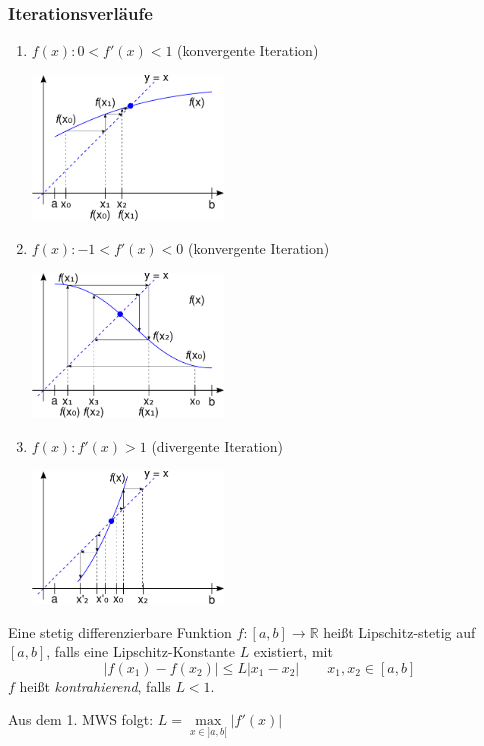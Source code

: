 \subsubsection{Iterationsverläufe}
\begin{enumerate}
	\item $f(x) : 0 < f'(x) < 1$ (konvergente Iteration)
	\begin{center}
		\includegraphics[width=0.4\textwidth]{include/20091215-1.pdf}
	\end{center}
	\item $f(x) : -1 < f'(x) < 0$ (konvergente Iteration)
	\begin{center}
		\includegraphics[width=0.4\textwidth]{include/20091215-2.pdf}
	\end{center}
	\item $f(x) : f'(x) > 1$ (divergente Iteration)
	\begin{center}
		\includegraphics[width=0.4\textwidth]{include/20091215-3.pdf}
	\end{center}
\end{enumerate}

\begin{definition}
	Eine stetig differenzierbare Funktion $f: [a, b] \rightarrow \mathbb{R}$ heißt Lipschitz-stetig auf $[a, b]$, falls eine Lipschitz-Konstante $L$ existiert, mit
	\begin{equation*}
		|f(x_1) - f(x_2)| \leq L |x_1 - x_2| \qquad x_1, x_2 \in [a, b]
	\end{equation*}
	$f$ heißt \emph{kontrahierend}, falls $L < 1$.
\end{definition}
\begin{note}
	Aus dem 1. MWS folgt: $L = \underset{x \in ]a, b[}{\max} |f'(x)|$
\end{note}

